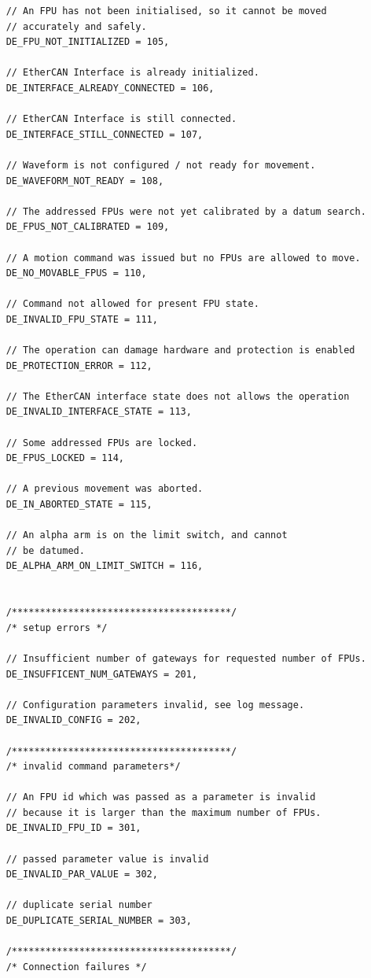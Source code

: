 \documentclass[11pt,a4paper]{report}
\begin{document}
\begin{verbatim}
    // An FPU has not been initialised, so it cannot be moved
    // accurately and safely.
    DE_FPU_NOT_INITIALIZED = 105,

    // EtherCAN Interface is already initialized.
    DE_INTERFACE_ALREADY_CONNECTED = 106,

    // EtherCAN Interface is still connected.
    DE_INTERFACE_STILL_CONNECTED = 107,

    // Waveform is not configured / not ready for movement.
    DE_WAVEFORM_NOT_READY = 108,

    // The addressed FPUs were not yet calibrated by a datum search.
    DE_FPUS_NOT_CALIBRATED = 109,

    // A motion command was issued but no FPUs are allowed to move.
    DE_NO_MOVABLE_FPUS = 110,

    // Command not allowed for present FPU state.
    DE_INVALID_FPU_STATE = 111,

    // The operation can damage hardware and protection is enabled
    DE_PROTECTION_ERROR = 112,

    // The EtherCAN interface state does not allows the operation
    DE_INVALID_INTERFACE_STATE = 113,

    // Some addressed FPUs are locked.
    DE_FPUS_LOCKED = 114,

    // A previous movement was aborted.
    DE_IN_ABORTED_STATE = 115,

    // An alpha arm is on the limit switch, and cannot
    // be datumed.
    DE_ALPHA_ARM_ON_LIMIT_SWITCH = 116,


    /***************************************/
    /* setup errors */

    // Insufficient number of gateways for requested number of FPUs.
    DE_INSUFFICENT_NUM_GATEWAYS = 201,

    // Configuration parameters invalid, see log message.
    DE_INVALID_CONFIG = 202,

    /***************************************/
    /* invalid command parameters*/

    // An FPU id which was passed as a parameter is invalid
    // because it is larger than the maximum number of FPUs.
    DE_INVALID_FPU_ID = 301,

    // passed parameter value is invalid
    DE_INVALID_PAR_VALUE = 302,

    // duplicate serial number
    DE_DUPLICATE_SERIAL_NUMBER = 303,

    /***************************************/
    /* Connection failures */


\end{verbatim}
\end{document}
